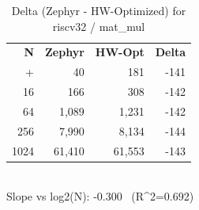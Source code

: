 \begin{table}[tb]
    \centering
    \caption{Delta (Zephyr - HW-Optimized) for riscv32 / mat_mul}
    \label{tab:delta_riscv32_mat_mul}
    \scriptsize
    \begin{tabular}{r r r r}
        \hline
        \textbf{N} & \textbf{Zephyr} & \textbf{HW-Opt} & \textbf{Delta} \\\n+        \hline
        4 & 40 & 181 & -141\\
        16 & 166 & 308 & -142\\
        64 & 1,089 & 1,231 & -142\\
        256 & 7,990 & 8,134 & -144\\
        1024 & 61,410 & 61,553 & -143\\
        \hline
    \end{tabular}
    \vspace{2mm}\\\n    Slope vs log2(N): -0.300 \ (R^2=0.692)\n\end{table}
